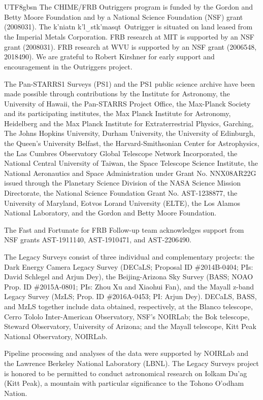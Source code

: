 \documentclass[twocolumn,linenumbers]{aastex631}
\newcommand{\kkoname}{k'ni\textipa{P}atn k'l$\left._\mathrm{\smile}\right.$stk'masqt}
\begin{document}
\begin{CJK*}{UTF8}{gbsn}
The CHIME/FRB Outriggers program is funded by 
the Gordon and Betty Moore Foundation and by a National Science Foundation (NSF) grant (2008031).
The \kkoname~Outrigger is situated on land leased from the Imperial Metals Corporation.
FRB research at MIT is supported by an NSF grant (2008031).
FRB research at WVU is supported by an NSF grant (2006548, 2018490). We are grateful to Robert Kirshner for early support and encouragement in the Outriggers project.

The Pan-STARRS1 Surveys (PS1) and the PS1 public science archive have been made possible through contributions by the Institute for Astronomy, the University of Hawaii, the Pan-STARRS Project Office, the Max-Planck Society and its participating institutes, the Max Planck Institute for Astronomy, Heidelberg and the Max Planck Institute for Extraterrestrial Physics, Garching, The Johns Hopkins University, Durham University, the University of Edinburgh, the Queen's University Belfast, the Harvard-Smithsonian Center for Astrophysics, the Las Cumbres Observatory Global Telescope Network Incorporated, the National Central University of Taiwan, the Space Telescope Science Institute, the National Aeronautics and Space Administration under Grant No. NNX08AR22G issued through the Planetary Science Division of the NASA Science Mission Directorate, the National Science Foundation Grant No. AST-1238877, the University of Maryland, Eotvos Lorand University (ELTE), the Los Alamos National Laboratory, and the Gordon and Betty Moore Foundation.

The Fast and Fortunate for FRB Follow-up team acknowledges support from NSF grants AST-1911140, AST-1910471, and AST-2206490.

The Legacy Surveys consist of three individual and complementary projects: the Dark Energy Camera Legacy Survey (DECaLS; Proposal ID \#2014B-0404; PIs: David Schlegel and Arjun Dey), the Beijing-Arizona Sky Survey (BASS; NOAO Prop. ID \#2015A-0801; PIs: Zhou Xu and Xiaohui Fan), and the Mayall z-band Legacy Survey (MzLS; Prop. ID \#2016A-0453; PI: Arjun Dey). DECaLS, BASS, and MzLS together include data obtained, respectively, at the Blanco telescope, Cerro Tololo Inter-American Observatory, NSF’s NOIRLab; the Bok telescope, Steward Observatory, University of Arizona; and the Mayall telescope, Kitt Peak National Observatory, NOIRLab. 

Pipeline processing and analyses of the data were supported by NOIRLab and the Lawrence Berkeley National Laboratory (LBNL). The Legacy Surveys project is honored to be permitted to conduct astronomical research on Iolkam Du'ag (Kitt Peak), a mountain with particular significance to the Tohono O'odham Nation.


\end{CJK*}
\end{document}
